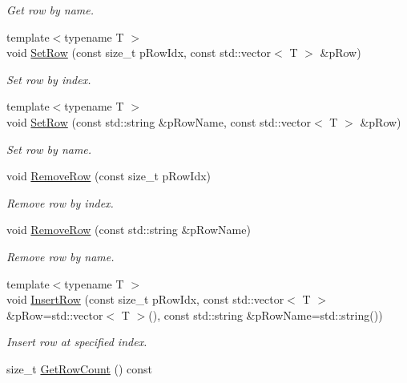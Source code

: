 \begin{DoxyCompactItemize}
\begin{DoxyCompactList}\small\item\em Get row by name. \end{DoxyCompactList}\item 
{\footnotesize template$<$typename T $>$ }\\void \hyperlink{classrapidcsv_1_1Document_a66ad9bc5f756fd0265b6852a325e3e43}{Set\+Row} (const size\+\_\+t p\+Row\+Idx, const std\+::vector$<$ T $>$ \&p\+Row)
\begin{DoxyCompactList}\small\item\em Set row by index. \end{DoxyCompactList}\item 
{\footnotesize template$<$typename T $>$ }\\void \hyperlink{classrapidcsv_1_1Document_a11d51fe0ab92ed52822e68edb6848b96}{Set\+Row} (const std\+::string \&p\+Row\+Name, const std\+::vector$<$ T $>$ \&p\+Row)
\begin{DoxyCompactList}\small\item\em Set row by name. \end{DoxyCompactList}\item 
void \hyperlink{classrapidcsv_1_1Document_adbcc87ce353137b900b135c42213b78e}{Remove\+Row} (const size\+\_\+t p\+Row\+Idx)
\begin{DoxyCompactList}\small\item\em Remove row by index. \end{DoxyCompactList}\item 
void \hyperlink{classrapidcsv_1_1Document_a43504afd4fc6e2912e0d004bc841425b}{Remove\+Row} (const std\+::string \&p\+Row\+Name)
\begin{DoxyCompactList}\small\item\em Remove row by name. \end{DoxyCompactList}\item 
{\footnotesize template$<$typename T $>$ }\\void \hyperlink{classrapidcsv_1_1Document_a7b4909b75796e7e2fbd14320fd6e9835}{Insert\+Row} (const size\+\_\+t p\+Row\+Idx, const std\+::vector$<$ T $>$ \&p\+Row=std\+::vector$<$ T $>$(), const std\+::string \&p\+Row\+Name=std\+::string())
\begin{DoxyCompactList}\small\item\em Insert row at specified index. \end{DoxyCompactList}\item 
size\+\_\+t \hyperlink{classrapidcsv_1_1Document_af8d77c33b83ceb7d7be284555db1f09f}{Get\+Row\+Count} () const

\end{DoxyCompactItemize}
